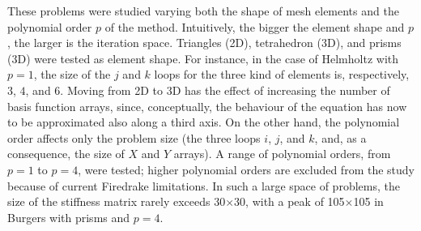 \documentclass[conference]{IEEEtran}
\begin{document}
These problems were studied varying both the shape of mesh elements and the polynomial order $p$ of the method. Intuitively, the bigger the element shape and $p$, the larger is the iteration space. Triangles (2D), tetrahedron (3D), and prisms (3D) were tested as element shape. For instance, in the case of Helmholtz with $p=1$, the size of the $j$ and $k$ loops for the three kind of elements is, respectively, $3$, $4$, and $6$. Moving from 2D to 3D has the effect of increasing the number of basis function arrays, since, conceptually, the behaviour of the equation has now to be approximated also along a third axis. On the other hand, the polynomial order affects only the problem size (the three loops $i$, $j$, and $k$, and, as a consequence, the size of $X$ and $Y$ arrays). A range of polynomial orders, from $p=1$ to $p=4$, were tested; higher polynomial orders are excluded from the study because of current Firedrake limitations. In such a large space of problems, the size of the stiffness matrix rarely exceeds 30$\times$30, with a peak of 105$\times$105 in Burgers with prisms and $p=4$. 
\end{document}
